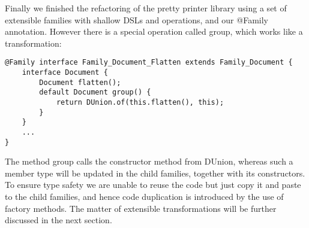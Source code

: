 Finally we finished the refactoring of the pretty printer library using a set of extensible families with shallow DSLs and operations, and our
\textsf{@Family} annotation. However there is a special operation called \textsf{group}, which works like a transformation:
\begin{lstlisting}
@Family interface Family_Document_Flatten extends Family_Document {
	interface Document {
		Document flatten();
		default Document group() {
			return DUnion.of(this.flatten(), this);
		}
	}
	...
}
\end{lstlisting}
The method \textsf{group} calls the constructor method from \textsf{DUnion}, whereas such a member type will be updated in the
child families, together with its constructors. To ensure type safety we are unable to reuse the code but just copy it and paste
to the child families, and hence code duplication is introduced by the use of factory methods. The matter of extensible
transformations will be further discussed in the next section.

